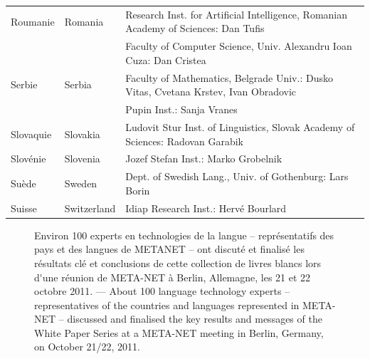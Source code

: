 \begin{longtable}{llp{105mm}}
  Roumanie & \textcolor{grey1}{Romania} & Research Inst. for Artificial Intelligence, Romanian Academy of Sciences: Dan Tufis \\ \addlinespace
  & & Faculty of Computer Science, Univ. Alexandru Ioan Cuza: Dan Cristea \\ \addlinespace

  Serbie & \textcolor{grey1}{Serbia} & Faculty of Mathematics, Belgrade Univ.: Dusko Vitas, Cvetana Krstev, Ivan Obradovic \\ \addlinespace
  & & Pupin Inst.: Sanja Vranes \\ \addlinespace  

  Slovaquie & \textcolor{grey1}{Slovakia} & Ludovit Stur Inst. of Linguistics, Slovak Academy of Sciences: Radovan Garabik \\ \addlinespace 

  Slovénie & \textcolor{grey1}{Slovenia} & Jozef Stefan Inst.: Marko Grobelnik \\ \addlinespace 

  Suède & \textcolor{grey1}{Sweden} & Dept. of Swedish Lang., Univ. of Gothenburg: Lars Borin \\ \addlinespace 

  Suisse & \textcolor{grey1}{Switzerland} & Idiap Research Inst.: Hervé Bourlard 
\end{longtable}
\normalsize

\renewcommand*{\figureformat}{}
\renewcommand*{\captionformat}{}

\begin{figure}[htbp]
  \center
  \caption{Environ 100 experts en technologies de la langue --
    représentatifs des pays et des langues de METANET -- ont discuté
    et finalisé les résultats clé et conclusions de cette collection
    de livres blancs lors d{\mbox '}une réunion de META-NET à Berlin,
    Allemagne, les 21 et 22 octobre 2011. --- \textcolor{grey1}{About
      100 language technology experts -- representatives of the
      countries and languages represented in META-NET -- discussed and
      finalised the key results and messages of the White Paper Series
      at a META-NET meeting in Berlin, Germany, on October 21/22,
      2011.}}
 \medskip
\end{figure}

\cleardoublepage

